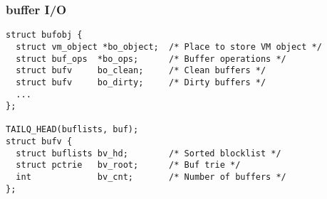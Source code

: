 \documentclass{beamer}
\begin{document}
\begin{frame}[fragile]
\frametitle{buffer I/O}
\begin{verbatim}
struct bufobj {
  struct vm_object *bo_object;  /* Place to store VM object */  
  struct buf_ops  *bo_ops;      /* Buffer operations */
  struct bufv     bo_clean;     /* Clean buffers */
  struct bufv     bo_dirty;     /* Dirty buffers */
  ...
};
 
TAILQ_HEAD(buflists, buf);
struct bufv {
  struct buflists bv_hd;        /* Sorted blocklist */
  struct pctrie   bv_root;      /* Buf trie */
  int             bv_cnt;       /* Number of buffers */
};
\end{verbatim}
\end{frame}
\end{document}
